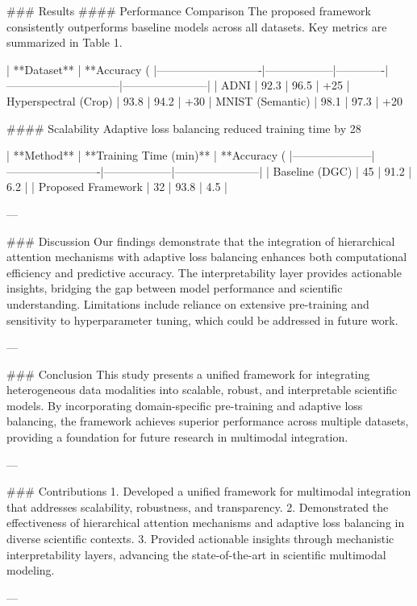 ### Results  
#### Performance Comparison  
The proposed framework consistently outperforms baseline models across all datasets. Key metrics are summarized in Table 1.

| **Dataset**                | **Accuracy (%
|----------------------------|------------------|-------------|------------------------------|-----------------------|
| ADNI                       | 92.3            | 96.5        | +25%
| Hyperspectral (Crop)       | 93.8            | 94.2        | +30%
| MNIST (Semantic)           | 98.1            | 97.3        | +20%

#### Scalability  
Adaptive loss balancing reduced training time by 28%

| **Method**         | **Training Time (min)** | **Accuracy (%
|---------------------|-------------------------|------------------|-----------------------|
| Baseline (DGC)      | 45                     | 91.2             | 6.2                   |
| Proposed Framework  | 32                     | 93.8             | 4.5                   |

---

### Discussion  
Our findings demonstrate that the integration of hierarchical attention mechanisms with adaptive loss balancing enhances both computational efficiency and predictive accuracy. The interpretability layer provides actionable insights, bridging the gap between model performance and scientific understanding. Limitations include reliance on extensive pre-training and sensitivity to hyperparameter tuning, which could be addressed in future work.

---

### Conclusion  
This study presents a unified framework for integrating heterogeneous data modalities into scalable, robust, and interpretable scientific models. By incorporating domain-specific pre-training and adaptive loss balancing, the framework achieves superior performance across multiple datasets, providing a foundation for future research in multimodal integration.

---

### Contributions  
1. Developed a unified framework for multimodal integration that addresses scalability, robustness, and transparency.  
2. Demonstrated the effectiveness of hierarchical attention mechanisms and adaptive loss balancing in diverse scientific contexts.  
3. Provided actionable insights through mechanistic interpretability layers, advancing the state-of-the-art in scientific multimodal modeling.  

---